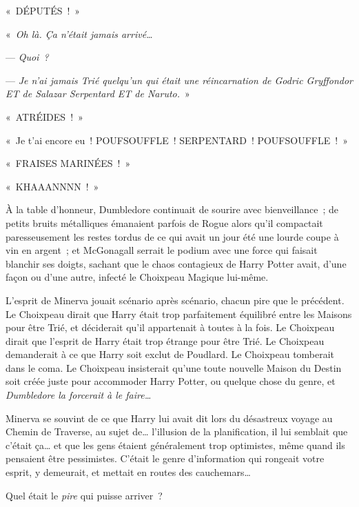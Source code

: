 \later

«~DÉPUTÉS~!~»

\later

«~\emph{Oh là. Ça n'était jamais arrivé…}

--- \emph{Quoi~?}

--- \emph{Je n'ai jamais Trié quelqu'un qui était une réincarnation de Godric Gryffondor ET de Salazar Serpentard ET de Naruto.}~»

\later

«~ATRÉIDES~!~»

\later

«~Je t'ai encore eu~! POUFSOUFFLE~! SERPENTARD~! POUFSOUFFLE~!~»

\later

«~FRAISES MARINÉES~!~»

\later

«~KHAAANNNN~!~»

\later

À la table d'honneur, Dumbledore continuait de sourire avec bienveillance~; de petits bruits métalliques émanaient parfois de Rogue alors qu'il compactait paresseusement les restes tordus de ce qui avait un jour été une lourde coupe à vin en argent~; et McGonagall serrait le podium avec une force qui faisait blanchir ses doigts, sachant que le chaos contagieux de Harry Potter avait, d'une façon ou d'une autre, infecté le Choixpeau Magique lui-même.

L'esprit de Minerva jouait scénario après scénario, chacun pire que le précédent. Le Choixpeau dirait que Harry était trop parfaitement équilibré entre les Maisons pour être Trié, et déciderait qu'il appartenait à toutes à la fois. Le Choixpeau dirait que l'esprit de Harry était trop étrange pour être Trié. Le Choixpeau demanderait à ce que Harry soit exclut de Poudlard. Le Choixpeau tomberait dans le coma. Le Choixpeau insisterait qu'une toute nouvelle Maison du Destin soit créée juste pour accommoder Harry Potter, ou quelque chose du genre, et \emph{Dumbledore la forcerait à le faire…}

Minerva se souvint de ce que Harry lui avait dit lors du désastreux voyage au Chemin de Traverse, au sujet de… l'illusion de la planification, il lui semblait que c'était ça… et que les gens étaient généralement trop optimistes, même quand ils pensaient être pessimistes. C'était le genre d'information qui rongeait votre esprit, y demeurait, et mettait en routes des cauchemars…

Quel était le \emph{pire} qui puisse arriver~?

